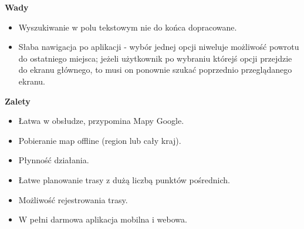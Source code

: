 \textbf{Wady}
\begin{itemize}
    \item Wyszukiwanie w polu tekstowym nie do końca dopracowane.
    \item Słaba nawigacja po aplikacji - wybór jednej opcji niweluje możliwość powrotu do ostatniego miejsca; jeżeli użytkownik po wybraniu którejś opcji przejdzie do ekranu głównego, to musi on ponownie szukać poprzednio przeglądanego ekranu.
\end{itemize}
\textbf{Zalety}
\begin{itemize}
    \item Łatwa w obsłudze, przypomina Mapy Google.
    \item Pobieranie map offline (region lub cały kraj).
    \item Płynność działania.
    \item Łatwe planowanie trasy z dużą liczbą punktów pośrednich.
    \item Możliwość rejestrowania trasy.
    \item W pełni darmowa aplikacja mobilna i webowa.
\end{itemize}



